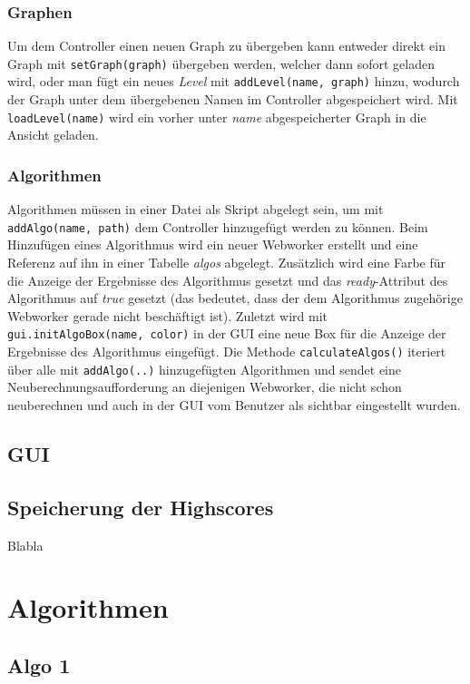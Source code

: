 \documentclass[a4paper,twocolumn]{scrartcl}
\begin{document}
\subsubsection{Graphen}
Um dem Controller einen neuen Graph zu übergeben kann entweder direkt ein Graph mit \texttt{setGraph(graph)} übergeben werden, welcher dann sofort geladen wird, oder man fügt ein neues \emph{Level} mit \texttt{addLevel(name, graph)} hinzu, wodurch der Graph unter dem übergebenen Namen im Controller abgespeichert wird. Mit \texttt{loadLevel(name)} wird ein vorher unter \emph{name} abgespeicherter Graph in die Ansicht geladen.

\subsubsection{Algorithmen}
Algorithmen müssen in einer Datei als Skript abgelegt sein, um mit \texttt{addAlgo(name, path)} dem Controller hinzugefügt werden zu können. Beim Hinzufügen eines Algorithmus wird ein neuer Webworker erstellt und eine Referenz auf ihn in einer Tabelle \emph{algos} abgelegt. Zusätzlich wird eine Farbe für die Anzeige der Ergebnisse des Algorithmus gesetzt und das \emph{ready}-Attribut des Algorithmus auf \emph{true} gesetzt (das bedeutet, dass der dem Algorithmus zugehörige Webworker gerade nicht beschäftigt ist). Zuletzt wird mit \texttt{gui.initAlgoBox(name, color)} in der GUI eine neue Box für die Anzeige der Ergebnisse des Algorithmus eingefügt.
Die Methode \texttt{calculateAlgos()} iteriert über alle mit \texttt{addAlgo(..)} hinzugefügten Algorithmen und sendet eine Neuberechnungsaufforderung an diejenigen Webworker, die nicht schon neuberechnen und auch in der GUI vom Benutzer als sichtbar eingestellt wurden.

\subsection{GUI}

\subsection{Speicherung der Highscores}
Blabla

\section{Algorithmen}

\subsection{Algo 1}
\end{document}
